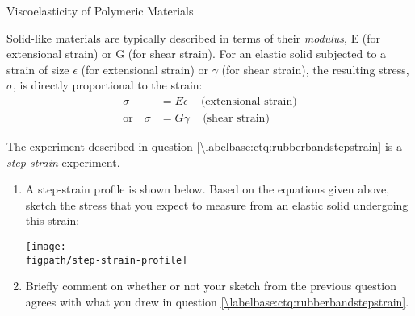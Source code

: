 \begin{activity}{Viscoelasticity of Polymeric Materials}
\begin{ctqs}
\end{ctqs}

\begin{infobox}

	Solid-like materials are typically described in terms of their \emph{modulus}, E (for extensional strain) or G (for shear strain).  For an elastic solid subjected to a strain of size $\epsilon$ (for extensional strain) or $\gamma$ (for shear strain), the resulting stress, $\sigma$, is directly proportional to the strain:
	\begin{align*}
		\sigma &= E\epsilon\,\,\,\,\,\,\,\text{(extensional strain)}\\
		\text{or}\,\,\,\,\,\,\sigma &= G\gamma\,\,\,\,\,\,\,\text{(shear strain)}
	\end{align*}
	
\end{infobox}

\clearpage
\begin{ctqs}
	\question The experiment described in question \ref{\labelbase:ctq:rubberbandstepstrain} is a \emph{step strain} experiment.
	
		\begin{enumerate}
			\item A step-strain profile is shown below.  Based on the equations given above, sketch the stress that you expect to measure from an elastic solid undergoing this strain:
			
				\begin{solution}[3.5in]
					\vspace{6pt}
					\centerline{\texttt{[image: \\figpath/step-strain-profile]}}
					\vspace{6pt}
				\end{solution}
				
			\item Briefly comment on whether or not your sketch from the previous question agrees with what you drew in question \ref{\labelbase:ctq:rubberbandstepstrain}.
			

\end{enumerate}
\end{ctqs}
\end{activity}
